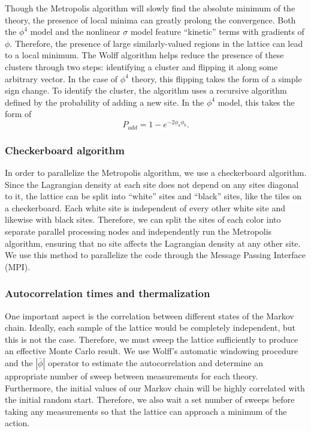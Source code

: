 \documentclass[12pt]{article}
\begin{document}
Though the Metropolis algorithm will slowly find the absolute minimum of the theory, the presence of local minima can greatly prolong the convergence. Both the $\phi^4$ model and the nonlinear $\sigma$ model feature ``kinetic'' terms with gradients of $\phi$. Therefore, the presence of large similarly-valued regions in the lattice can lead to a local minimum. The Wolff algorithm helps reduce the presence of these clusters through two steps: identifying a cluster and flipping it along some arbitrary vector. In the case of $\phi^4$ theory, this flipping takes the form of a simple sign change. To identify the cluster, the algorithm uses a recursive algorithm defined by the probability of adding a new site. In the $\phi^4$ model, this takes the form of
\begin{equation}
    P_{add} = 1-e^{-2\phi_a\phi_b}.
\end{equation}


\subsubsection{Checkerboard algorithm}

In order to parallelize the Metropolis algorithm, we use a checkerboard algorithm. Since the Lagrangian density at each site does not depend on any sites diagonal to it, the lattice can be split into ``white'' sites and ``black'' sites, like the tiles on a checkerboard. Each white site is independent of every other white site and likewise with black sites. Therefore, we can split the sites of each color into separate parallel processing nodes and independently run the Metropolis algorithm, ensuring that no site affects the Lagrangian density at any other site. We use this method to parallelize the code through the Message Passing Interface (MPI).

\subsubsection{Autocorrelation times and thermalization}
One important aspect is the correlation between different states of the Markov chain. Ideally, each sample of the lattice would be completely independent, but this is not the case. Therefore, we must sweep the lattice sufficiently to produce an effective Monte Carlo result. We use Wolff's automatic windowing procedure \cite{wolff2007} and the $|\bar\phi|$ operator to estimate the autocorrelation and determine an appropriate number of sweep between measurements for each theory. Furthermore, the initial values of our Markov chain will be highly correlated with the initial random start. Therefore, we also wait a set number of sweeps before taking any measurements so that the lattice can approach a minimum of the action.
\end{document}
